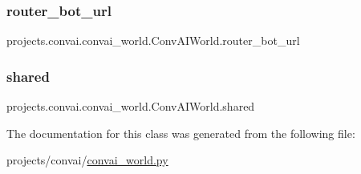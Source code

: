 \subsubsection{\texorpdfstring{router\+\_\+bot\+\_\+url}{router\_bot\_url}}
{\footnotesize\ttfamily projects.\+convai.\+convai\+\_\+world.\+Conv\+A\+I\+World.\+router\+\_\+bot\+\_\+url}

\mbox{\label{classprojects_1_1convai_1_1convai__world_1_1ConvAIWorld_a77e455138f285c6edaf494890a5dc774}} 
\subsubsection{\texorpdfstring{shared}{shared}}
{\footnotesize\ttfamily projects.\+convai.\+convai\+\_\+world.\+Conv\+A\+I\+World.\+shared}



The documentation for this class was generated from the following file\+:\begin{DoxyCompactItemize}
\item 
projects/convai/\hyperlink{convai__world_8py}{convai\+\_\+world.\+py}\end{DoxyCompactItemize}
